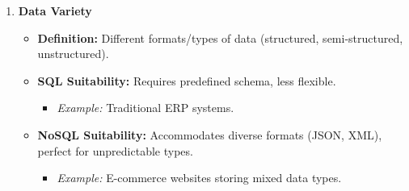 \documentclass[aspectratio=169]{beamer}
\begin{document}
\begin{frame}[fragile]
\begin{enumerate}
        \item \textbf{Data Variety}
            \begin{itemize}
                \item \textbf{Definition:} Different formats/types of data (structured, semi-structured, unstructured).
                \item \textbf{SQL Suitability:} Requires predefined schema, less flexible.
                    \begin{itemize}
                        \item \textit{Example:} Traditional ERP systems.
                    \end{itemize}
                \item \textbf{NoSQL Suitability:} Accommodates diverse formats (JSON, XML), perfect for unpredictable types.
                    \begin{itemize}
                        \item \textit{Example:} E-commerce websites storing mixed data types.
                    \end{itemize}
            \end{itemize}
    \end{enumerate}
\end{frame}
\end{document}
